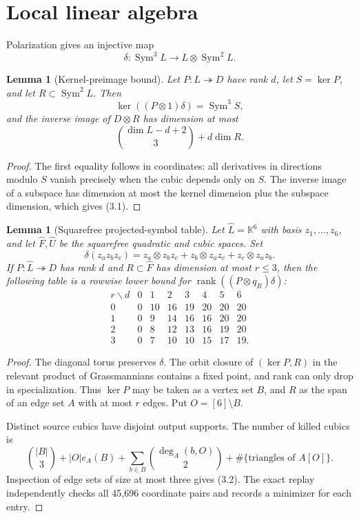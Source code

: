 \documentclass[11pt]{amsart}
\newcommand{\K}{\mathbb{K}}
\newcommand{\Sym}{\operatorname{Sym}}
\newcommand{\rank}{\operatorname{rank}}
\newtheorem{lemma}[theorem]{Lemma}
\theoremstyle{definition}
\begin{document}
\section{Local linear algebra}

Polarization gives an injective map
\[
 \delta:\Sym^3L\longrightarrow L\otimes\Sym^2L.
\]

\begin{lemma}[Kernel-preimage bound]\label{lem:kernel-preimage}
Let \(P:L\twoheadrightarrow D\) have rank \(d\), let \(S=\ker P\), and
let \(R\subset\Sym^2L\). Then
\[
 \ker((P\otimes1)\delta)=\Sym^3S,
\]
and the inverse image of \(D\otimes R\) has dimension at most
\[
 \boxed{\binom{\dim L-d+2}{3}+d\dim R.} \tag{3.1}
\]
\end{lemma}

\begin{proof}
The first equality follows in coordinates: all derivatives in directions
modulo \(S\) vanish precisely when the cubic depends only on \(S\). The
inverse image of a subspace has dimension at most the kernel dimension plus
the subspace dimension, which gives (3.1).
\end{proof}

\begin{lemma}[Squarefree projected-symbol table]\label{lem:squarefree}
Let \(\widehat L=\K^6\) with basis \(z_1,\ldots,z_6\), and let
\(\widehat F,\widehat U\) be the squarefree quadratic and cubic spaces. Set
\[
 \delta(z_az_bz_c)=z_a\otimes z_bz_c+z_b\otimes z_az_c
                    +z_c\otimes z_az_b.
\]
If \(P:\widehat L\twoheadrightarrow D\) has rank \(d\) and
\(R\subset\widehat F\) has dimension at most \(r\le3\), then the following
table is a rowwise lower bound for
\(\rank((P\otimes q_R)\delta)\):
\[
\begin{array}{c|rrrrrrr}
r\backslash d&0&1&2&3&4&5&6\\ \hline
0&0&10&16&19&20&20&20\\
1&0&9&14&16&16&20&20\\
2&0&8&12&13&16&19&20\\
3&0&7&10&10&15&17&19.
\end{array} \tag{3.2}
\]
\end{lemma}

\begin{proof}
The diagonal torus preserves \(\delta\). The orbit closure of
\((\ker P,R)\) in the relevant product of Grassmannians contains a fixed
point, and rank can only drop in specialization. Thus \(\ker P\) may be
taken as a vertex set \(B\), and \(R\) as the span of an edge set \(A\)
with at most \(r\) edges. Put \(O=[6]\setminus B\).

Distinct source cubics have disjoint output supports. The number of killed
cubics is
\[
 \binom{|B|}{3}+|O|e_A(B)
 +\sum_{b\in B}\binom{\deg_A(b,O)}2
 +\#\{\text{triangles of }A[O]\}. \tag{3.3}
\]
Inspection of edge sets of size at most three gives (3.2). The exact replay
independently checks all 45,696 coordinate pairs and records a minimizer for
each entry.
\end{proof}
\end{document}
